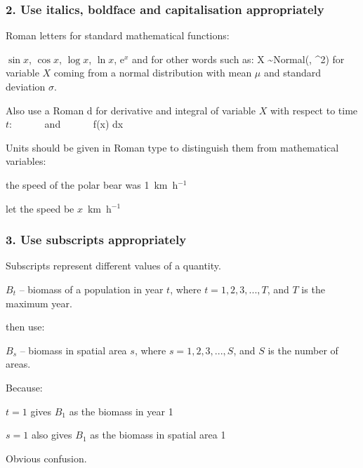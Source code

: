 

\begin{frame}
\frametitle{2. Use italics, boldface and capitalisation appropriately}

Roman letters for standard mathematical functions:
\bi
\item $\sin x$, $\cos x$, $\log x$, $\ln x$, e$^x$
\ei
and for other words such as:
\eb
\nonumber X \sim \mbox{Normal}(\mu, \sigma^2)
\label{Xnormal}
\ee
\pause
for variable $X$ coming from a normal distribution with mean $\mu$ and
standard deviation $\sigma$.
\pause

\medskip
Also use a Roman d for derivative and integral of variable $X$ with respect to time $t$:
\eb
\nonumber {} ~~~~~~\mbox{and}~~~~~~ \int f(x) \mbox{d}x
\ee

\pause
\medskip

Units should be given in Roman type to distinguish them from mathematical variables:
\bi
\item the speed of the polar bear was 1~km~h$^{-1}$
\item let the speed be $x$~km~h$^{-1}$
\ei

\end{frame}


\begin{frame}
\frametitle{3. Use subscripts appropriately}

Subscripts represent different values of a quantity.

\bi
\item $B_t$ -- biomass of a population in year $t$, where
$t=1, 2, 3, ..., T$, and $T$ is the maximum year.
\ei

\pause

 then use:

\bi
\item $B_s$ -- biomass in spatial area $s$, where $s=1, 2, 3, ..., S$, and $S$
  is the number of areas.
  \ei

\pause

Because:

\bi
\item $t=1$ gives $B_1$ as the biomass in year 1

\item $s=1$ also gives $B_1$ as the biomass in spatial area 1
\ei

Obvious confusion.

\end{frame}

